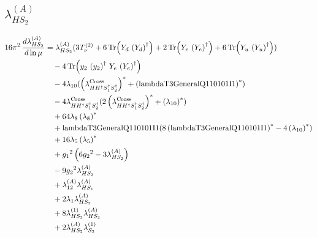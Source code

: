 \documentclass[10pt,a4paper]{article}
\begin{document}
\subsection*{$\lambda_{HS_2}^{(A)}$}
\begin{align*}
16\pi^2\,\frac{d \lambda_{HS_2}^{(A)}}{d\ln\mu} &={\lambda_{HS_2}^{(A)}} (3 T_{\nu}^{(2)}+6 \operatorname{Tr}\!\left({Y_d}\,\left({Y_d}\right)^{\dagger}\right)+2 \operatorname{Tr}\!\left({Y_e}\,\left({Y_e}\right)^{\dagger}\right)+6 \operatorname{Tr}\!\left({Y_u}\,\left({Y_u}\right)^{\dagger}\right)) \\
&\quad -4 \operatorname{Tr}\!\left({y_2}\,\left({y_2}\right)^{\dagger}\,{Y_e}\,\left({Y_e}\right)^{\dagger}\right) \\
&\quad -4 {\lambda_{10}} (\left({\lambda_{H H^\dagger S_1^\dagger S_2^\dagger}^{\rm Cross}}\right)^{*}+\left(\text{lambdaT3GeneralQ110101I1}\right)^{*}) \\
&\quad -4 {\lambda_{H H^\dagger S_1^\dagger S_2^\dagger}^{\rm Cross}} (2 \left({\lambda_{H H^\dagger S_1^\dagger S_2^\dagger}^{\rm Cross}}\right)^{*}+\left({\lambda_{10}}\right)^{*}) \\
&\quad +64 {\lambda_{8}} \left({\lambda_{8}}\right)^{*} \\
&\quad +\text{lambdaT3GeneralQ110101I1} (8 \left(\text{lambdaT3GeneralQ110101I1}\right)^{*}-4 \left({\lambda_{10}}\right)^{*}) \\
&\quad +16 {\lambda_5} \left({\lambda_5}\right)^{*} \\
&\quad +{g_1}^2 \left(6 {g_2}^2-3 {\lambda_{HS_2}^{(A)}}\right) \\
&\quad -9 {g_2}^2 {\lambda_{HS_2}^{(A)}} \\
&\quad +{\lambda_{12}^{(A)}} {\lambda_{HS_1}^{(A)}} \\
&\quad +2 {\lambda_1} {\lambda_{HS_2}^{(A)}} \\
&\quad +8 {\lambda_{HS_2}^{(1)}} {\lambda_{HS_2}^{(A)}} \\
&\quad +2 {\lambda_{HS_2}^{(A)}} {\lambda_{S_2}^{(1)}} \\
\end{align*}
\end{document}
